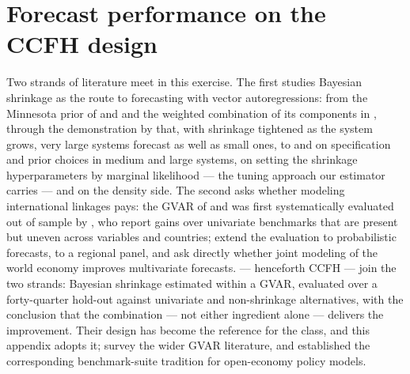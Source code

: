 
\section{Forecast performance on the CCFH design}\label{app:ccfhperf}

Two strands of literature meet in this exercise. The first studies Bayesian shrinkage as
the route to forecasting with vector autoregressions: from the Minnesota prior of
\citet{DoanLittermanSims1984} and \citet{Litterman1986} and the weighted combination of
its components in \citet{simszha1998}, through the demonstration by
\citet{BanburaGiannoneReichlin2010} that, with shrinkage tightened as the system grows,
very large systems forecast as well as small ones, to
\citet{Koop2013} and \citet{CarrieroClarkMarcellino2015} on specification and prior
choices in medium and large systems, \citet{Giannone2015} on setting the shrinkage
hyperparameters by marginal likelihood --- the tuning approach our estimator carries ---
and \citet{Clark2011} on the density side. The second asks whether modeling
international linkages pays: the GVAR of \citet{PesaranSchuermannWeiner2004} and
\citet{DeesDiMauroPesaranSmith2007} was first systematically evaluated out of sample by
\citet{PesaranSchuermannSmith2009}, who report gains over univariate benchmarks that are
present but uneven across variables and countries; \citet{GreenwoodNimmoNguyenShin2012}
extend the evaluation to probabilistic forecasts, \citet{HanNg2011} to a regional panel,
and \citet{DovernFeldkircherHuber2015} ask directly whether joint modeling of the world
economy improves multivariate forecasts. \citet{CrespoFeldkircherHuber2016} ---
henceforth CCFH --- join the two strands: Bayesian shrinkage estimated within a GVAR,
evaluated over a forty-quarter hold-out against univariate and non-shrinkage
alternatives, with the conclusion that the combination --- not either ingredient alone
--- delivers the improvement. Their design has become the reference for the class, and
this appendix adopts it; \citet{ChudikPesaran2016} survey the wider GVAR literature, and
\citet{AdolfsonLindeVillani2007} established the corresponding benchmark-suite tradition
for open-economy policy models.


